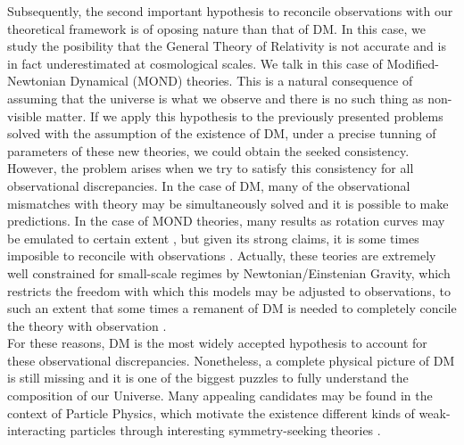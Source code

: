 Subsequently, the second important hypothesis to reconcile observations with our theoretical framework is of oposing nature than that of DM. In this case, we study the posibility that the General Theory of Relativity is not accurate and is in fact underestimated at cosmological scales. We talk in this case of Modified-Newtonian Dynamical (MOND) theories. This is a natural consequence of assuming that the universe is what we observe and there is no such thing as non-visible matter. If we apply this hypothesis to the previously presented problems solved with the assumption of the existence of DM, under a precise tunning of parameters of these new theories, we could obtain the seeked consistency. However, the problem arises when we try to satisfy this consistency for all observational discrepancies. In the case of DM, many of the observational mismatches with theory may be simultaneously solved and it is possible to make predictions. In the case of MOND theories, many results as rotation curves may be emulated to certain extent \cite{MOND}, but given its strong claims, it is some times imposible to reconcile with observations \cite{MOND NO}. Actually, these teories are extremely well constrained for small-scale regimes by Newtonian/Einstenian Gravity, which restricts the freedom with which this models may be adjusted to observations, to such an extent that some times a remanent of DM is needed to completely concile the theory with observation \cite{DM remanent.}.\\

For these reasons, DM is the most widely accepted hypothesis to account for these observational discrepancies. Nonetheless, a complete physical picture of DM is still missing and it is one of the biggest puzzles to fully understand the composition of our Universe. Many appealing candidates may be found in the context of Particle Physics, which motivate the existence different kinds of weak-interacting particles through interesting symmetry-seeking theories \cite{particle physics.}.\\

